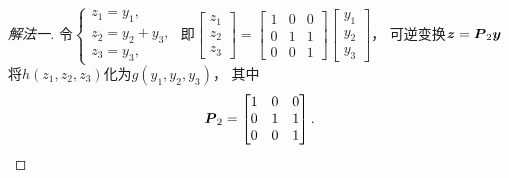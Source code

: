 \begin{example}
\begin{solution}
\begin{proof}[解法一]
令\(\left\{ \begin{array}{l}
	z_1 = y_1, \\
	z_2 = y_2 + y_3, \\
	z_3 = y_3,
\end{array} \right.\)
即\(\begin{bmatrix}
	z_1 \\ z_2 \\ z_3
\end{bmatrix}
= \begin{bmatrix}
	1 & 0 & 0 \\
	0 & 1 & 1 \\
	0 & 0 & 1
\end{bmatrix}
\begin{bmatrix}
	y_1 \\ y_2 \\ y_3
\end{bmatrix}\)，
可逆变换\(\boldsymbol{z} = \boldsymbol{P}_2 \boldsymbol{y}\)将\(h(z_1,z_2,z_3)\)化为\(g(y_1,y_2,y_3)\)，
其中\begin{equation*}
	\boldsymbol{P}_2 = \begin{bmatrix}
		1 & 0 & 0 \\
		0 & 1 & 1 \\
		0 & 0 & 1
	\end{bmatrix}.
\end{equation*}


\end{proof}
\end{solution}
\end{example}
